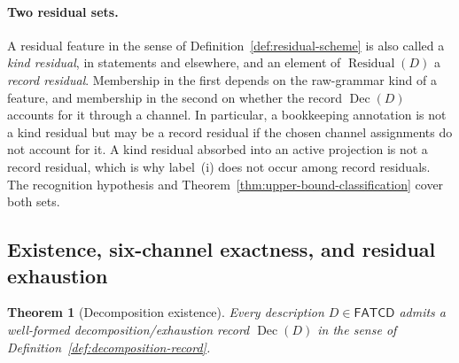 \documentclass[11pt]{article}
\newtheorem{theorem}{Theorem}[section]
\theoremstyle{definition}
\newcommand{\FATCD}{\ensuremath{\mathsf{FATCD}}}
\newcommand{\Dec}[1]{\ensuremath{\operatorname{Dec}\!\left(#1\right)}}
\newcommand{\Residual}[1]{\ensuremath{\operatorname{Residual}\!\left(#1\right)}}
\begin{document}
\paragraph{Two residual sets.} A residual feature in the sense of
Definition~\ref{def:residual-scheme} is also called a \emph{kind residual}, in
statements and elsewhere, and an element of \(\Residual{D}\) a \emph{record
residual}.
Membership in the first depends on the raw-grammar kind of a feature, and
membership in the second on whether the record \(\Dec{D}\) accounts for it
through a channel. In particular, a bookkeeping annotation is not a kind
residual but may be a record residual if the chosen channel assignments do not
account for it. A kind residual absorbed into an active projection is not a
record residual, which is why label~(i) does not occur among record residuals.
The recognition hypothesis and
Theorem~\ref{thm:upper-bound-classification} cover both sets.


\subsection{Existence, six-channel exactness, and residual exhaustion}\label{subsec:dec-theorems}

\begin{theorem}[Decomposition existence]\label{thm:decomposition-existence}
Every description \(D \in \FATCD{}\) admits a well-formed decomposition/exhaustion
record \(\Dec{D}\) in the sense of
Definition~\ref{def:decomposition-record}.
\end{theorem}
\end{document}
